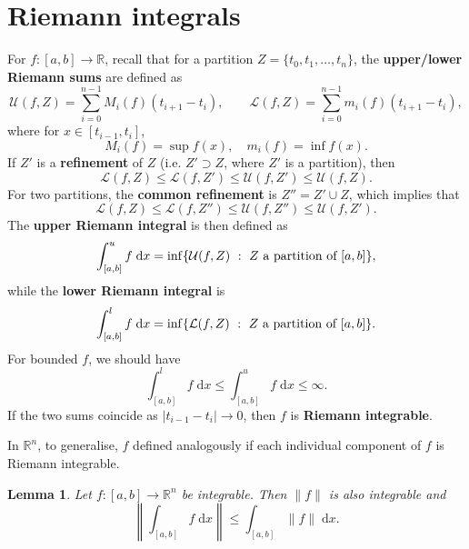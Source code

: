 \documentclass[letter-paper]{tufte-book}
\newtheorem{lemma}[theorem]{\color{pastel-blue}Lemma}
\begin{document}

\section{Riemann integrals}

For $f: [a,b] \to \mathbb{R}$, recall that for a partition $Z = \{t_0, t_1,
\ldots, t_n\}$, the \textbf{upper/lower Riemann sums} are defined as
\begin{equation}
  \mathcal{U}(f, Z) = \sum_{i=0}^{n-1} M_i(f)(t_{i+1}-t_i), \qquad \mathcal{L}(f, Z) = \sum_{i=0}^{n-1} m_i(f)(t_{i+1}-t_i),
\end{equation}
where for $x \in [t_{i-1}, t_i]$,
\begin{equation*}
  M_i(f) = \sup f(x), \quad m_i(f) = \inf f(x).
\end{equation*}
If $Z'$ is a \textbf{refinement} of $Z$ (i.e. $Z' \supset Z$, where $Z'$ is a
partition), then
\begin{equation*}
  \mathcal{L}(f, Z) \leq \mathcal{L}(f, Z') \leq \mathcal{U}(f, Z') \leq \mathcal{U}(f, Z).
\end{equation*}
For two partitions, the \textbf{common refinement} is $Z'' = Z' \cup Z$, which
implies that
\begin{equation*}
  \mathcal{L}(f, Z) \leq \mathcal{L}(f, Z'') \leq \mathcal{U}(f, Z'') \leq \mathcal{U}(f, Z').
\end{equation*}
The \textbf{upper Riemann integral} is then defined as
\begin{equation}
  \int_{[a,b]}^u f\; \mathrm{d}x = \inf \{\mathcal{U}(f, Z)\ :\ Z\ \textnormal{a partition of } [a,b]\},
\end{equation}
while the \textbf{lower Riemann integral} is
\begin{equation}
  \int_{[a,b]}^l f\; \mathrm{d}x = \inf \{\mathcal{L}(f, Z)\ :\ Z\ \textnormal{a partition of } [a,b]\}.
\end{equation}
For bounded $f$, we should have
\begin{equation*}
  \int_{[a,b]}^l f\; \mathrm{d}x \leq \int_{[a,b]}^u f\; \mathrm{d}x \leq \infty.
\end{equation*}
If the two sums coincide as $|t_{i-1} - t_i|\to 0$, then $f$ is \textbf{Riemann
integrable}.

In $\mathbb{R}^n$, to generalise, $f$ defined analogously if each individual
component of $f$ is Riemann integrable.

\begin{lemma}
  Let $f : [a,b] \to \mathbb{R}^n$ be integrable. Then $\|f\|$ is also integrable and
  \begin{equation*}
    \left\| \int_{[a,b]} f\; \mathrm{d}x \right\| \leq \int_{[a,b]} \|f\|\; \mathrm{d}x.
  \end{equation*}
\end{lemma}
\end{document}
